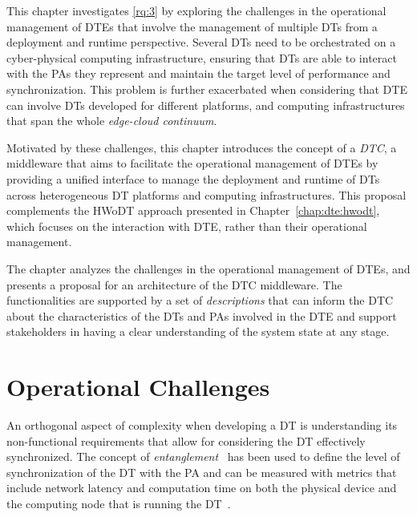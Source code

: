 This chapter investigates \ref{rq:3} by exploring the challenges in the operational management of \acp{DTE} that involve the management of multiple \acp{DT} from a deployment and runtime perspective.
%
Several \acp{DT} need to be orchestrated on a cyber-physical computing infrastructure, ensuring that \acp{DT} are able to interact with the \acp{PA} they represent and maintain the target level of performance and synchronization. 
%
This problem is further exacerbated when considering that \ac{DTE} can involve \acp{DT} developed for different platforms, and computing infrastructures that span the whole \emph{edge-cloud continuum}. 

Motivated by these challenges, this chapter introduces the concept of a \emph{\ac{DTC}}, a middleware that aims to facilitate the operational management of \acp{DTE} by providing a unified interface to manage the deployment and runtime of \acp{DT} across heterogeneous \ac{DT} platforms and computing infrastructures.
%
This proposal complements the \ac{HWoDT} approach presented in Chapter~\ref{chap:dte:hwodt}, which focuses on the interaction with \ac{DTE}, rather than their operational management. 

The chapter analyzes the challenges in the operational management of \acp{DTE}, and presents a proposal for an architecture of the \ac{DTC} middleware. The functionalities are supported by a set of \emph{descriptions} that can inform the \ac{DTC} about the characteristics of the \acp{DT} and \acp{PA} involved in the \ac{DTE} and support stakeholders in having a clear understanding of the system state at any stage.


\section{Operational Challenges}

An orthogonal aspect of complexity when developing a \ac{DT} is understanding its non-functional requirements that allow for considering the \ac{DT} effectively synchronized.
%
The concept of \emph{entanglement}~\cite{dt-IoT-context-Minerva-2020} has been used to define the level of synchronization of the \ac{DT} with the \ac{PA} and can be measured with metrics that include network latency and computation time on both the physical device and the computing node that is running the \ac{DT}~\cite{bellavista2024odte}.


